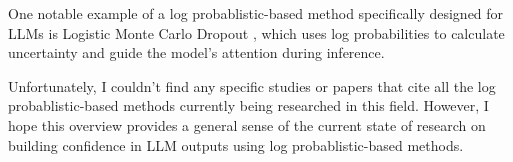 One notable example of a log probablistic-based method specifically designed for
LLMs is Logistic Monte Carlo Dropout , which uses log probabilities to calculate
uncertainty and guide the model's attention during inference.

Unfortunately, I couldn't find any specific studies or papers that cite all the
log probablistic-based methods currently being researched in this field. However,
I hope this overview provides a general sense of the current state of research
on building confidence in LLM outputs using log probablistic-based methods.